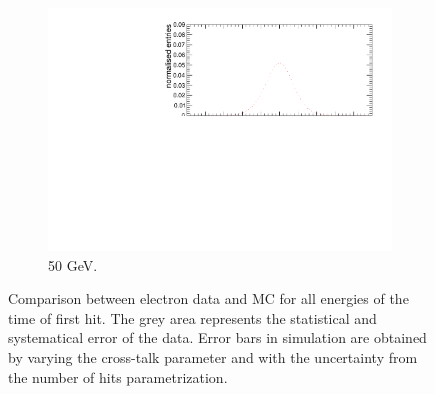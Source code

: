 \begin{figure}[htbp!]
\begin{subfigure}[t]{0.5\textwidth}
    \centering
    \includegraphics[width=1\textwidth]{../Thesis_Plots/Timing/Electrons/Plots/Comparison_SimData_Electrons50GeV.pdf}
    \caption{50 GeV.}\label{fig:elec_sim_data_50GeV}
  \end{subfigure}
  \caption{Comparison between electron data and MC for all energies of the time of first hit. The grey area represents the statistical and systematical error of the data. Error bars in simulation are obtained by varying the cross-talk parameter and with the uncertainty from the number of hits parametrization.} \label{fig:sim_data_elec_add}
\end{figure}


